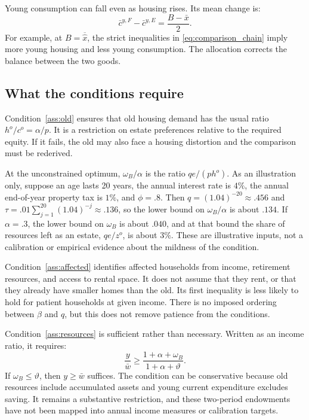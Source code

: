 \documentclass[11pt]{article}
\newcommand{\avg}[1]{\overline{#1}}
\begin{document}
Young consumption can fall even as housing rises. Its mean change is:
\begin{equation}
\bar c^{y,F}-\bar c^{y,E}=\frac{B-\bar x}{2}.
\label{eq:consumption_change}
\end{equation}
For example, at $B=\avg{\widehat x}$, the strict inequalities in
\eqref{eq:comparison_chain} imply more young housing and less young
consumption. The allocation corrects the balance between the two goods.

\subsection{What the conditions require}

Condition~\eqref{ass:old} ensures that old housing demand has the usual ratio
$h^o/c^o=\alpha/p$. It is a restriction on estate preferences relative to
the required equity. If it fails, the old may also face a housing distortion
and the comparison must be rederived.

At the unconstrained optimum, $\omega_B/\alpha$ is the ratio
$qe/(ph^o)$. As an illustration only, suppose an age lasts 20 years, the
annual interest rate is $4\%$, the annual end-of-year property tax is $1\%$,
and $\phi=.8$. Then $q=(1.04)^{-20}\approx .456$ and
$\tau=.01\sum_{j=1}^{20}(1.04)^{-j}\approx .136$, so the lower bound on
$\omega_B/\alpha$ is about $.134$. If $\alpha=.3$, the lower bound on
$\omega_B$ is about $.040$, and at that bound the share of resources left as an
estate, $qe/z^o$, is about $3\%$. These are illustrative inputs,
not a calibration or empirical evidence about the mildness of the condition.

Condition~\eqref{ass:affected} identifies affected households from income,
retirement resources, and access to rental space. It does not assume that
they rent, or that they already have smaller homes than the old. Its first
inequality is less likely to hold for patient households at given income.
There is no imposed ordering between $\beta$ and $q$, but this does not
remove patience from the conditions.

Condition~\eqref{ass:resources} is sufficient rather than necessary. Written
as an income ratio, it requires:
\begin{equation}
\frac{y}{\bar w}\ge\frac{1+\alpha+\omega_B}{1+\alpha+\vartheta}.
\label{eq:income_ratio}
\end{equation}
If $\omega_B\le\vartheta$, then $y\ge\bar w$ suffices. The condition can
be conservative because old resources include accumulated assets and young
current expenditure excludes saving. It remains a substantive restriction,
and these two-period endowments have not been mapped into annual income
measures or calibration targets.
\end{document}
